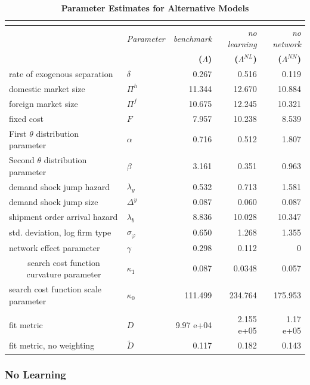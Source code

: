 \documentclass[12pt,titlepage]{article}
\begin{document}
\begin{table}
    \centering
{\small 
\begin{tabular}{llrrr}
\multicolumn{5}{c}{\textbf{}} \\ \hline\hline
& \textit{Parameter} & \textit{benchmark} & \textit{no learning} & \textit{%
no network} \\ 
&  & \textbf{(}$\Lambda $\textbf{)} & \textbf{(}$\Lambda ^{NL}$\textbf{)} & 
\textbf{(}$\Lambda ^{NN}$\textbf{)} \\ \cline{2-5}
rate of exogenous separation & $\delta $ & 0.267 & 0.516 & 0.119 \\ 
domestic market size & $\Pi ^{h}$ & 11.344 & 12.670 & 10.884 \\ 
foreign market size & $\Pi ^{f}$ & 10.675 & 12.245 & 10.321 \\ 
fixed cost & $F$ & 7.957 & 10.238 & 8.539 \\ 
First $\theta $ distribution parameter & $\alpha $ & 0.716 & 0.512 & 1.807
\\ 
Second $\theta $ distribution parameter & $\beta $ & 3.161 & 0.351 & 0.963
\\ 
demand shock jump hazard & $\lambda _{y}$ & 0.532 & 0.713 & 1.581 \\ 
demand shock jump size & $\Delta ^{y}$ & 0.087 & 0.060 & 0.087 \\ 
shipment order arrival hazard & $\lambda _{b}$ & 8.836 & 10.028 & 10.347 \\ 
std. deviation, log firm type & $\sigma _{\varphi }$ & 0.650 & 1.268 & 1.355
\\ 
network effect parameter & $\gamma $ & 0.298 & 0.112 & 0 \\ 
\multicolumn{1}{c}{search cost function curvature parameter} & $\kappa _{1}$
& 0.087 & 0.0348 & 0.057 \\ 
search cost function scale parameter & $\kappa _{0}$ & 111.499 & 234.764 & 
175.953 \\ 
&  &  &  &  \\ 
fit metric & $D$ & 9.97 e+04 & 2.155 e+05 & 1.17 e+05 \\ 
fit metric, no weighting & $\widetilde{D}$ & 0.117 & 0.182 & 0.143 \\ \hline
\end{tabular}%
}
\caption{\textbf{Parameter Estimates for Alternative Models}}
\label{tab:alt_est}
\end{table}

\bigskip



\subsubsection{No Learning}
\end{document}
